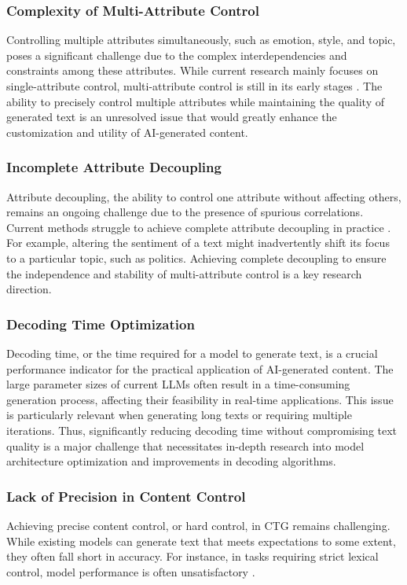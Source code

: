 \documentclass[acmsmall, screen]{acmart}
\begin{document}
\subsubsection{\textbf{Complexity of Multi-Attribute Control}}
Controlling multiple attributes simultaneously, such as emotion, style, and topic, poses a significant challenge due to the complex interdependencies and constraints among these attributes. While current research mainly focuses on single-attribute control, multi-attribute control is still in its early stages \cite{gu_emnlp22_Discrete}. The ability to precisely control multiple attributes while maintaining the quality of generated text is an unresolved issue that would greatly enhance the customization and utility of AI-generated content.

\subsubsection{\textbf{Incomplete Attribute Decoupling}}
Attribute decoupling, the ability to control one attribute without affecting others, remains an ongoing challenge due to the presence of spurious correlations. Current methods struggle to achieve complete attribute decoupling in practice \cite{zhiting_nips21_SCM}. For example, altering the sentiment of a text might inadvertently shift its focus to a particular topic, such as politics. Achieving complete decoupling to ensure the independence and stability of multi-attribute control is a key research direction.

\subsubsection{\textbf{Decoding Time Optimization}}
Decoding time, or the time required for a model to generate text, is a crucial performance indicator for the practical application of AI-generated content. The large parameter sizes of current LLMs often result in a time-consuming generation process, affecting their feasibility in real-time applications. This issue is particularly relevant when generating long texts or requiring multiple iterations. Thus, significantly reducing decoding time without compromising text quality is a major challenge that necessitates in-depth research into model architecture optimization and improvements in decoding algorithms.

\subsubsection{\textbf{Lack of Precision in Content Control}}
Achieving precise content control, or hard control, in CTG remains challenging. While existing models can generate text that meets expectations to some extent, they often fall short in accuracy. For instance, in tasks requiring strict lexical control, model performance is often unsatisfactory \cite{ashok_arxiv24_ConGenBench}.
\end{document}
